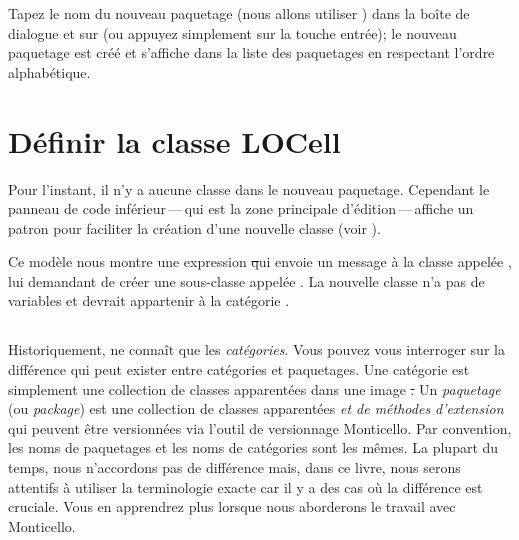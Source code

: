 \documentclass[a4paper,10pt,twoside]{book}
\begin{document}
Tapez le nom du nouveau paquetage (nous allons utiliser
) dans la boîte de dialogue et \clickz{} sur
 (ou appuyez simplement sur la touche entrée); le nouveau
paquetage est créé et s'affiche dans la liste des paquetages en
respectant l'ordre alphabétique.

\section{Définir la classe LOCell}

Pour l'instant, il n'y a aucune classe dans le nouveau paquetage. Cependant le
panneau de code inférieur\,---\,qui est la zone principale
d'édition\,---\,affiche un patron pour faciliter la création d'une
nouvelle classe (voir ).

Ce modèle nous montre une expression \st qui envoie un message à la
classe appelée , lui demandant de créer une sous-classe
appelée .  La nouvelle classe n'a pas de variables
et devrait appartenir à la catégorie .

\subsection{}

Historiquement, \st{} ne connaît que les \emph{catégories}. Vous
pouvez vous interroger sur la différence qui peut exister entre
catégories et paquetages.
Une catégorie est simplement une collection de classes apparentées
dans une image \st. Un \emph{paquetage} (ou \emph{package})
est une collection de classes apparentées \emph{et de méthodes
  d'extension} qui peuvent être versionnées via l'outil de versionnage
Monticello.
Par convention, les noms de paquetages et les noms de catégories sont
les mêmes.
La plupart du temps, nous n'accordons pas de différence mais, dans ce
livre, nous serons attentifs à utiliser la terminologie exacte car il
y a des cas où la différence est cruciale.
Vous en apprendrez plus lorsque nous aborderons le travail avec
Monticello.

\end{document}
